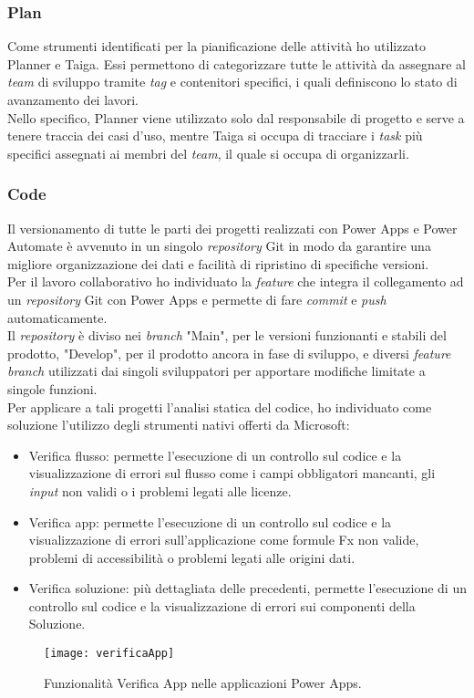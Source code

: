 \subsubsection*{Plan}
Come strumenti identificati per la pianificazione delle attività ho utilizzato Planner e Taiga.
Essi permettono di categorizzare tutte le attività da assegnare al \emph{team} di sviluppo tramite \emph{tag} e contenitori specifici, i quali definiscono lo stato di avanzamento dei lavori.\\
Nello specifico, Planner viene utilizzato solo dal responsabile di progetto e serve a tenere traccia dei casi d'uso, mentre Taiga si occupa di tracciare i \emph{task} più specifici assegnati ai membri del \emph{team}, il quale si occupa di organizzarli.

\subsubsection*{Code}
Il versionamento di tutte le parti dei progetti realizzati con Power Apps e Power Automate è avvenuto in un singolo \emph{repository} Git in modo da garantire una migliore organizzazione dei dati e facilità di ripristino di specifiche versioni.\\
Per il lavoro collaborativo ho individuato la \emph{feature} che integra il collegamento ad un \emph{repository} Git con Power Apps e permette di fare \emph{commit} e \emph{push} automaticamente.\\
Il \emph{repository} è diviso nei \emph{branch} "Main", per le versioni funzionanti e stabili del prodotto, "Develop", per il prodotto ancora in fase di sviluppo, e diversi \emph{feature branch} utilizzati dai singoli sviluppatori per apportare modifiche limitate a singole funzioni.\\
Per applicare a tali progetti l'analisi statica del codice, ho individuato come soluzione l'utilizzo degli strumenti nativi offerti da Microsoft:
\begin{itemize}
    \item Verifica flusso: permette l'esecuzione di un controllo sul codice e la visualizzazione di errori sul flusso come i campi obbligatori mancanti, gli \emph{input} non validi o i problemi legati alle licenze. 
    \item Verifica app: permette l'esecuzione di un controllo sul codice e la visualizzazione di errori sull'applicazione come formule Fx non valide, problemi di accessibilità o problemi legati alle origini dati. 
    \item Verifica soluzione: più dettagliata delle precedenti, permette l'esecuzione di un controllo sul codice e la visualizzazione di errori sui componenti della Soluzione.
\end{itemize}
\begin{figure}[htbp] 
    \centering 
    \texttt{[image: verificaApp]} 
    \caption{Funzionalità Verifica App nelle applicazioni Power Apps.}
    \label{fig:verificaApp}
\end{figure}

